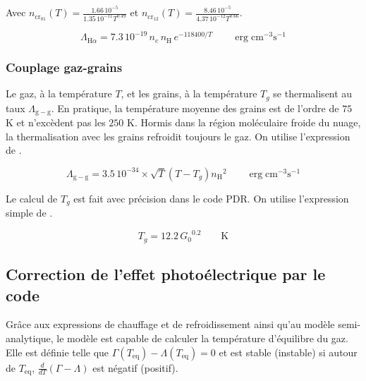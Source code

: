 Avec $n_{\mathrm{cr}_{01}}(T) = \frac{1.66\,10^{-5} }{1.35\,10^{-11} T^{0.49}} $ et $n_{\mathrm{cr}_{12}}(T) = \frac{8.46\,10^{-5} }{4.37\,10^{-12} T^{0.66}} $.

\begin{equation}
    \Lambda_{\mathrm{H}\alpha} = 7.3\, 10^{-19}\,n_e\,n_\mathrm{H}\,e^{-118400/T} \qquad \operatorname{erg} \mathrm{cm}^{-3} \mathrm{s}^{-1}
\end{equation}

\subsubsection{Couplage gaz-grains}

Le gaz, à la température $T$, et les grains, à la température $T_g$ se thermalisent au taux $\Lambda_{\mathrm{g}-\mathrm{g}}$. En pratique, la température moyenne des grains est de l'ordre de $75$ K et n'excèdent pas les $250$ K. Hormis dans la région moléculaire froide du nuage, la thermalisation avec les grains refroidit toujours le gaz. On utilise l'expression de \cite{Rollig2005}.

\begin{equation}
    \Lambda_{\mathrm{g}-\mathrm{g}} = 3.5\,10^{-34}\times \sqrt{T}(T - T_g) {n_\mathrm{H}}^2 \qquad \operatorname{erg} \mathrm{cm}^{-3} \mathrm{s}^{-1}
\end{equation}

Le calcul de $T_g$ est fait avec précision dans le code PDR. On utilise l'expression simple de \cite{Hollenbach1991}. 

\begin{equation}
    T_g = 12.2 \,{G_0}^{0.2} \qquad \mathrm{K}
\end{equation}



\subsection{Correction de l'effet photoélectrique par le code}

Grâce aux expressions de chauffage et de refroidissement ainsi qu'au modèle semi-analytique, le modèle est capable de calculer la température d'équilibre du gaz. Elle est définie telle que $\Gamma(T_{\mathrm{eq}}) - \Lambda(T_{\mathrm{eq}}) = 0$ et est stable (instable) si autour de $T_{\mathrm{eq}}$, $\frac{d}{dT}(\Gamma - \Lambda)$ est négatif (positif). \newline 

